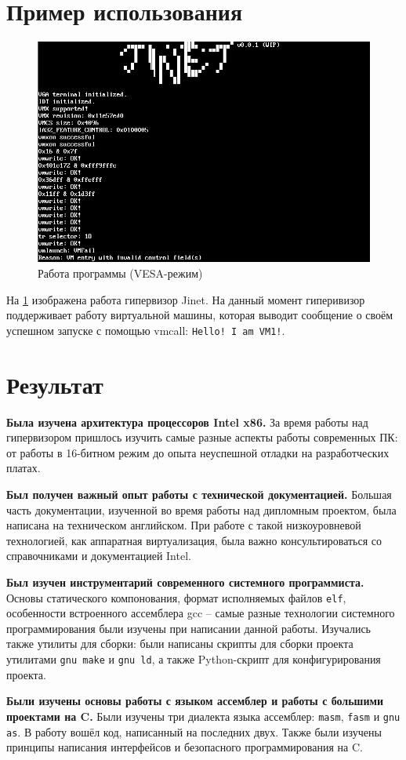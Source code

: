\documentclass[a4paper,12pt]{extarticle}
\begin{document}
	\section{Пример использования}
	\begin{figure}[htb]
		\centering
		\includegraphics[width=0.55\linewidth]{../diagrams/jinet_vesa}
		\caption{Работа программы (VESA-режим)}
		\label{fig:jinetvesa}
	\end{figure}
		На \cref{fig:jinetvesa} изображена работа гипервизор Jinet. На данный момент гиперивизор поддерживает работу виртуальной машины, которая выводит сообщение о своём успешном запуске с помощью vmcall: \texttt{Hello! I am VM1!}.
	\section{Результат}
	\textbf{Была изучена архитектура процессоров Intel x86.} За время работы над гипервизором пришлось изучить самые разные аспекты работы современных ПК: от работы в 16-битном режим до опыта неуспешной отладки на разработческих платах.\par
	\textbf{Был получен важный опыт работы с технической документацией.} Большая часть документации, изученной во время работы над дипломным проектом, была написана на техническом английском. При работе с такой низкоуровневой технологией, как аппаратная виртуализация, была важно консультироваться со справочниками и документацией Intel.\par
	\textbf{Был изучен инструментарий современного системного программиста.} Основы статического компонования, формат исполняемых файлов \texttt{elf}, особенности встроенного ассемблера gcc -- самые разные технологии системного программирования были изучены при написании данной работы. Изучались также утилиты для сборки: были написаны скрипты для сборки проекта утилитами \texttt{gnu make} и \texttt{gnu ld}, а также Python-скрипт для конфигурирования проекта.\par
	\textbf{Были изучены основы работы с языком ассемблер и работы с большими проектами на C.} Были изучены три диалекта языка ассемблер: \texttt{masm}, \texttt{fasm} и \texttt{gnu as}. В работу вошёл код, написанный на последних двух. Также были изучены принципы написания интерфейсов и безопасного программирования на C.\par
\end{document}
